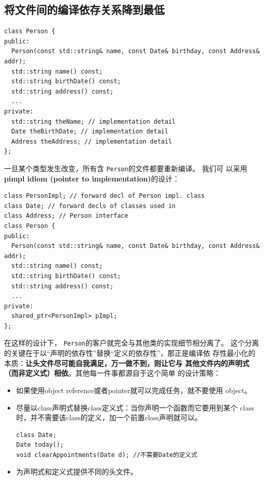 \documentclass[a4paper,twoside]{article}
\theoremstyle{definition}
\theoremstyle{remark}
\numberwithin{equation}{section}
\let\OldTexttt\texttt
\renewcommand{\texttt}[1]{{\color{blue} \OldTexttt{#1}}}
\begin{document}
\subsection{将文件间的编译依存关系降到最低}
\label{sec:Item-31}
\begin{verbatim}
class Person {
public:
  Person(const std::string& name, const Date& birthday, const Address& addr);
  std::string name() const;
  std::string birthDate() const;
  std::string address() const;
  ...
private:
  std::string theName; // implementation detail
  Date theBirthDate; // implementation detail
  Address theAddress; // implementation detail
};
\end{verbatim}
一旦某个类型发生改变，所有含\texttt{Person}的文件都要重新编译。 我们可
以采用\textbf{pimpl idiom (pointer to implementation)}的设计：
\begin{verbatim}
class PersonImpl; // forward decl of Person impl. class
class Date; // forward decls of classes used in
class Address; // Person interface
class Person {
public:
  Person(const std::string& name, const Date& birthday, const Address& addr);
  std::string name() const;
  std::string birthDate() const;
  std::string address() const;
  ...
private:
  shared_ptr<PersonImpl> pImpl;
};
\end{verbatim}
在这样的设计下，\texttt{Person}的客户就完全与其他类的实现细节相分离了。
这个分离的关键在于以“声明的依存性”替换“定义的依存性”，那正是编译依
存性最小化的本质：\textbf{让头文件尽可能自我满足，万一做不到，则让它与
  其他文件内的声明式（而非定义式）相依}。其他每一件事都源自于这个简单
的设计策略：
\begin{itemize}
\item 如果使用object reference或者pointer就可以完成任务，就不要使用
  object。
\item 尽量以class声明式替换class定义式：当你声明一个函数而它要用到某个
  class时，并不需要该class的定义，加一个前置class声明就可以。
\begin{verbatim}
class Date;
Date today();
void clearAppointments(Date d); //不需要Date的定义式
\end{verbatim}
\item 为声明式和定义式提供不同的头文件。
\end{itemize}
\end{document}
